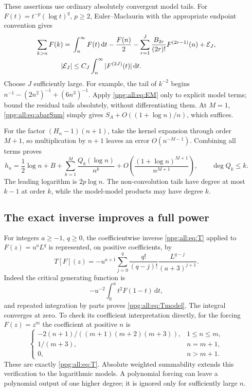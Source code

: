 \documentclass[11pt,letterpaper]{article}
\theoremstyle{remark}\newtheorem{remark}[theorem]{Remark}
\numberwithin{equation}{section}
\newcommand{\dd}{\mathrm d}
\begin{document}
These assertions use ordinary absolutely convergent model tails. For $F(t)=t^{-p}(\log t)^q$, $p\ge2$, Euler--Maclaurin with the appropriate endpoint convention gives
\begin{align}
 \sum_{k>n}F(k)={}&\int_n^\infty F(t)\,\dd t-\frac{F(n)}2
  -\sum_{r=1}^J\frac{B_{2r}}{(2r)!}F^{(2r-1)}(n)+\mathcal E_J,
 \label{ppg:all:eq:EM}\\
 |\mathcal E_J|&\le C_J\int_n^\infty |F^{(2J)}(t)|\,\dd t.\notag
\end{align}
Choose $J$ sufficiently large. For example, the tail of $k^{-2}$ begins
$n^{-1}-(2n^2)^{-1}+(6n^3)^{-1}$. Apply \eqref{ppg:all:eq:EM} only to explicit model terms; bound the residual tails absolutely, without differentiating them. At $M=1$, \eqref{ppg:all:eq:abarSum} simply gives $S_A+O((1+\log n)/n)$, which suffices.

For the factor $(H_n-1)(n+1)$, take the kernel expansion through order $M+1$, so multiplication by $n+1$ leaves an error $O(n^{-M-1})$. Combining all terms proves
\begin{equation}\label{ppg:all:eq:hexp}
 h_n=\frac12\log n+B+\sum_{k=1}^M\frac{Q_k(\log n)}{n^k}
       +O\!\left(\frac{(1+\log n)^{M+1}}{n^{M+1}}\right),
 \qquad \deg Q_k\le k.
\end{equation}
The leading logarithm is $2p\log n$. The non-convolution tails have degree at most $k-1$ at order $k$, while the model-model products may have degree $k$.

\subsection{The exact inverse improves a full power}
For integers $a\ge-1$, $q\ge0$, the coefficientwise inverse \eqref{ppg:all:eq:T} applied to $F(z)=u^aL^q$ is represented, on positive coefficients, by
\begin{equation}\label{ppg:all:eq:Tmodel}
 T[F](z)=-u^{a+1}\sum_{j=0}^q
       \frac{q!}{(q-j)!}\frac{L^{q-j}}{(a+3)^{j+1}}.
\end{equation}
Indeed the critical generating function is
\[
 -u^{-2}\int_0^u t^2F(1-t)\,\dd t,
\]
and repeated integration by parts proves \eqref{ppg:all:eq:Tmodel}. The integral converges at zero. To check its coefficient interpretation directly, for the forcing $F(z)=z^m$ the coefficient at positive $n$ is
\[
 \begin{cases}
  -2(n+1)/((m+1)(m+2)(m+3)),&1\le n\le m,\\
  1/(m+3),&n=m+1,\\
  0,&n>m+1.
 \end{cases}
\]
These are exactly \eqref{ppg:all:eq:T}. Absolute weighted summability extends this verification to the logarithmic models. A polynomial forcing can leave a polynomial output of one higher degree; it is ignored only for sufficiently large $n$.
\end{document}
